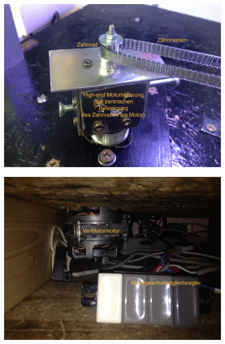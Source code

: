 \begin{frame}{}
\vspace*{-.5cm}
\begin{figure}
\center
\includegraphics[height=\textheight]{Plots/Motor_oben}
\end{figure}
\end{frame}

\begin{frame}{}
\vspace*{-.5cm}
\begin{figure}
\center
\includegraphics[height=\textheight]{Plots/Motor}
\end{figure}
\end{frame}

